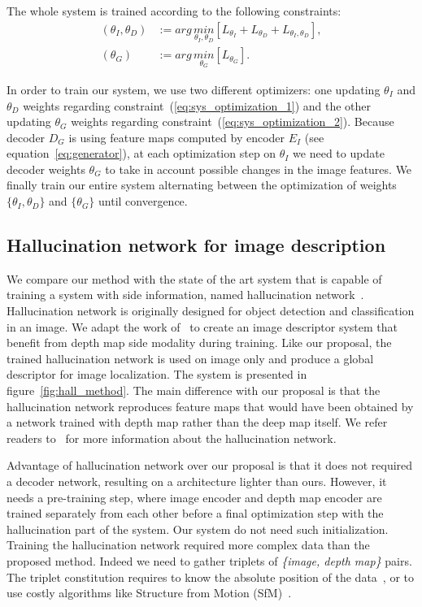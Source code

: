 The whole system is trained according to the following constraints:
\begin{align}
	\left( \theta_{I}, \theta_{D} \right) & := arg\,\underset{\theta_{I}, \theta_{D}}{min} \left[ L_{\theta_{I}} + L_{\theta_{D}} + L_{\theta_{I},\theta_{D}} \right], \label{eq:sys_optimization_1} \\ 	
	\left( \theta_{G} \right) & := arg\,\underset{\theta_{G}}{min} \left[ L_{\theta_{G}} \right]. 	\label{eq:sys_optimization_2}
\end{align}

In order to train our system, we use two different optimizers: one updating $\theta_{I}$ and $\theta_{D}$ weights regarding constraint~(\ref{eq:sys_optimization_1}) and the other updating $\theta_{G}$ weights regarding constraint~(\ref{eq:sys_optimization_2}). Because decoder $D_G$ is using feature maps computed by encoder $E_I$ (see equation~\ref{eq:generator}), at each optimization step on $\theta_{I}$ we need to update decoder weights $\theta_{G}$ to take in account possible changes in the image features. We finally train our entire system alternating between the optimization of weights $\{\theta_{I}, \theta_{D}\}$ and $\{\theta_G\}$ until convergence.

\subsection{Hallucination network for image description}
\label{subsec:hall}
We compare our method with the state of the art system that is capable of training a system with side information, named hallucination network~\cite{Hoffman2016}. Hallucination network is originally designed for object detection and classification in an image. We adapt the work of~\cite{Hoffman2016} to create an image descriptor system that benefit from depth map side modality during training. Like our proposal, the trained hallucination network is used on image only and produce a global descriptor for image localization. The system is presented in figure~\ref{fig:hall_method}. The main difference with our proposal is that the hallucination network reproduces feature maps that would have been obtained by a network trained with depth map rather than the deep map itself. We refer readers to~\cite{Hoffman2016} for more information about the hallucination network.

Advantage of hallucination network over our proposal is that it does not required a decoder network, resulting on a architecture lighter than ours. However, it needs a pre-training step, where image encoder and depth map encoder are trained separately from each other before a final optimization step with the hallucination part of the system. Our system do not need such initialization. Training the hallucination network required more complex data than the proposed method. Indeed we need to gather triplets of \textit{\{image, depth map\}} pairs. The triplet constitution requires to know the absolute position of the data~\cite{Arandjelovic2017,Liu2018}, or to use costly algorithms like Structure from Motion (SfM)~\cite{Godard2017,Radenovic2017,Kim2017a}. 

